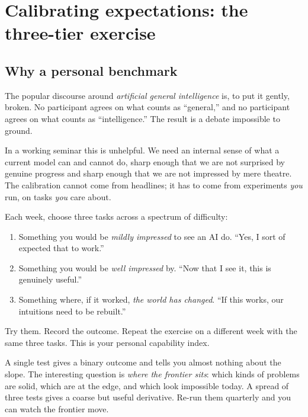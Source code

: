 
\section{Calibrating expectations: the three-tier exercise}%
\label{sec:three-tier}

\subsection{Why a personal benchmark}

The popular discourse around \emph{artificial general
intelligence} is, to put it gently, broken.  No participant
agrees on what counts as ``general,'' and no participant
agrees on what counts as ``intelligence.''  The result is a
debate impossible to ground.

In a working seminar this is unhelpful.  We need an internal
sense of what a current model can and cannot do, sharp
enough that we are not surprised by genuine progress and
sharp enough that we are not impressed by mere theatre.  The
calibration cannot come from headlines; it has to come from
experiments \emph{you} run, on tasks \emph{you} care about.

\begin{keyresult}\label{kr:three-tier}
  Each week, choose three tasks across a spectrum of difficulty:
  \begin{enumerate}[(T1)]
    \item Something you would be \emph{mildly impressed} to
      see an AI do.  ``Yes, I sort of expected that to work.''
    \item Something you would be \emph{well impressed} by.
      ``Now that I see it, this is genuinely useful.''
    \item Something where, if it worked, \emph{the world has
      changed}.  ``If this works, our intuitions need to be
      rebuilt.''
  \end{enumerate}
  Try them.  Record the outcome.  Repeat the exercise on a
  different week with the same three tasks.  This is your
  personal capability index.
\end{keyresult}

\begin{intuition}
  A single test gives a binary outcome and tells you almost
  nothing about the slope.  The interesting question is
  \emph{where the frontier sits}: which kinds of problems are
  solid, which are at the edge, and which look impossible
  today.  A spread of three tests gives a coarse but useful
  derivative.  Re-run them quarterly and you can watch the
  frontier move.
\end{intuition}

